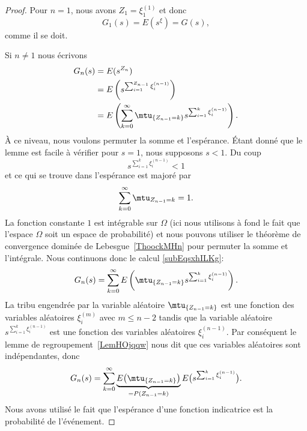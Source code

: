 \begin{proof}
	Pour \( n=1\), nous avons \( Z_1=\xi^{(1)}_1\) et donc
	\begin{equation}
		G_1(s)=E(s^{\xi})=G(s),
	\end{equation}
	comme il se doit.

	Si \( n\neq 1\) nous écrivons
	\begin{subequations}    \label{subEqsxhILKg}
		\begin{align}
			G_n(s) & =E(s^{Z_n})                                                                              \\
			       & =E\left( s^{\sum_{i=1}^{Z_{n-1}}\xi_i^{(n-1)}} \right)                                   \\
			       & =E\left( \sum_{k=0}^{\infty}\mtu_{\{ Z_{n-1}=k \}}s^{\sum_{i=1}^k\xi_i^{(n-1)}} \right).
		\end{align}
	\end{subequations}
	À ce niveau, nous voulons permuter la somme et l'espérance. Étant donné que le lemme est facile à vérifier pour \( s=1\), nous supposons \( s<1\). Du coup
	\begin{equation}
		s^{\sum_{i=1}^k\xi_i^{(n-1)}}<1
	\end{equation}
	et ce qui se trouve dans l'espérance est majoré par
	\begin{equation}
		\sum_{k=0}^{\infty}\mtu_{Z_{n-1}=k}=1.
	\end{equation}
	La fonction constante \( 1\) est intégrable sur \( \Omega\) (ici nous utilisons à fond le fait que l'espace \( \Omega\) soit un espace de probabilité) et nous pouvons utiliser le théorème de convergence dominée de Lebesgue~\ref{ThoockMHn} pour permuter la somme et l'intégrale. Nous continuons donc le calcul \eqref{subEqsxhILKg}:
	\begin{equation}
		G_n(s)=\sum_{k=0}^{\infty}E\left(  \mtu_{\{ Z_{n-1}=k \}}s^{\sum_{i=1}^k\xi_i^{(n-1)}}  \right).
	\end{equation}
	La tribu engendrée par la variable aléatoire \( \mtu_{\{ Z_{n-1}=k \}}\) est une fonction des variables aléatoires \( \xi_i^{(m)}\) avec \( m\leq n-2\) tandis que la variable aléatoire \( s^{\sum_{i=1}^k\xi_i^{(n-1)}}\) est une fonction des variables aléatoires \( \xi_{i}^{(n-1)}\). Par conséquent le lemme de regroupement~\ref{LemHOjqqw} nous dit que ces variables aléatoires sont indépendantes, donc
	\begin{equation}
		G_n(s)=\sum_{k=0}^{\infty}\underbrace{E\big( \mtu_{\{ Z_{n-1}=k \}} \big)}_{=P(Z_{n-1}=k)}E\big( s^{\sum_{i=1}^{k}\xi_i^{(n-1)}} \big).
	\end{equation}
	Nous avons utilisé le fait que l'espérance d'une fonction indicatrice est la probabilité de l'événement.


\end{proof}
